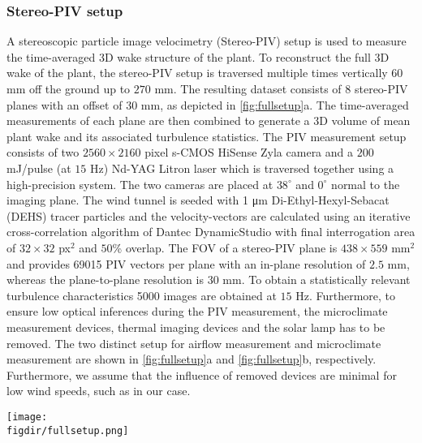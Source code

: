 \subsubsection*{Stereo-PIV setup}
A stereoscopic particle image velocimetry (Stereo-PIV) setup is used to measure the time-averaged 3D wake structure of the plant. To reconstruct the full 3D wake of the plant, the stereo-PIV setup is traversed multiple times vertically $60$ mm off the ground up to $270$ mm. The resulting dataset consists of 8 stereo-PIV planes with an offset of $30$ mm, as depicted in \cref{fig:fullsetup}a. The time-averaged measurements of each plane are then combined to generate a 3D volume of mean plant wake and its associated turbulence statistics. The PIV measurement setup consists of two $2560\times2160$ pixel s-CMOS HiSense Zyla camera and a $200$ mJ/pulse (at $15$ Hz) Nd-YAG Litron laser which is traversed together using a high-precision system. The two cameras are placed at $38^{\circ}$ and $0^{\circ}$ normal to the imaging plane. The wind tunnel is seeded with 1 μm Di-Ethyl-Hexyl-Sebacat (DEHS) tracer particles and the velocity-vectors are calculated using an iterative cross-correlation algorithm of Dantec DynamicStudio with final interrogation area of $32\times32$ px$^2$ and $50$\% overlap. The FOV of a stereo-PIV plane is $438\times559$ mm$^2$ and provides \num{69015} PIV vectors per plane with an in-plane resolution of $2.5$ mm, whereas the plane-to-plane resolution is $30$ mm. To obtain a statistically relevant turbulence characteristics \num{5000} images are obtained at $15$ Hz. Furthermore, to ensure low optical inferences during the PIV measurement, the microclimate measurement devices, thermal imaging devices and the solar lamp has to be removed. The two distinct setup for airflow measurement and microclimate measurement are shown in \cref{fig:fullsetup}a and \cref{fig:fullsetup}b, respectively. Furthermore, we assume that the influence of removed devices are minimal for low wind speeds, such as in our case.
	
	\begin{sidewaysfigure}[p]
		\centering
		\texttt{[image: \\figdir/fullsetup.png]}
		\caption{Wind tunnel setup used to measure the  airflow and microclimate of the plant:  A stereo-PIV setup for multi-plane time-averaged measured consisting of $8$ horizontal plane, $z=[60,90,120,150,180,210,240,270]$ mm,  A microclimate measurement setup consisting of solar simulator, IR camera and SHT sensors inside the wind tunnel, mass balance and other data acquisition system below the wind tunnel through an access panel. The two distinct setups are required for non-interfered optical measurement of the PIV.}
		\label{fig:fullsetup}
	\end{sidewaysfigure}
	
